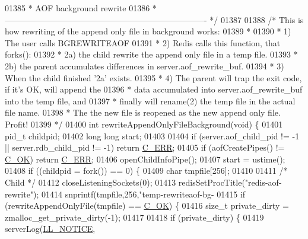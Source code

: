 \begin{DoxyCode}
{{{{{{{{{{{{{{{{{{{{{{{01385 \textcolor{comment}{ * AOF background rewrite}
01386 \textcolor{comment}{ * ------------------------------------------------------------------------- */}
01387 
01388 \textcolor{comment}{/* This is how rewriting of the append only file in background works:}
01389 \textcolor{comment}{ *}
01390 \textcolor{comment}{ * 1) The user calls BGREWRITEAOF}
01391 \textcolor{comment}{ * 2) Redis calls this function, that forks():}
01392 \textcolor{comment}{ *    2a) the child rewrite the append only file in a temp file.}
01393 \textcolor{comment}{ *    2b) the parent accumulates differences in server.aof\_rewrite\_buf.}
01394 \textcolor{comment}{ * 3) When the child finished '2a' exists.}
01395 \textcolor{comment}{ * 4) The parent will trap the exit code, if it's OK, will append the}
01396 \textcolor{comment}{ *    data accumulated into server.aof\_rewrite\_buf into the temp file, and}
01397 \textcolor{comment}{ *    finally will rename(2) the temp file in the actual file name.}
01398 \textcolor{comment}{ *    The the new file is reopened as the new append only file. Profit!}
01399 \textcolor{comment}{ */}
01400 \textcolor{keywordtype}{int} rewriteAppendOnlyFileBackground(\textcolor{keywordtype}{void}) \{
01401     pid\_t childpid;
01402     \textcolor{keywordtype}{long} \textcolor{keywordtype}{long} start;
01403 
01404     \textcolor{keywordflow}{if} (server.aof\_child\_pid != -1 || server.rdb\_child\_pid != -1) \textcolor{keywordflow}{return} 
      \hyperlink{server_8h_af98ac28d5f4d23d7ed5985188e6fb7d1}{C\_ERR};
01405     \textcolor{keywordflow}{if} (aofCreatePipes() != \hyperlink{server_8h_a303769ef1065076e68731584e758d3e1}{C\_OK}) \textcolor{keywordflow}{return} \hyperlink{server_8h_af98ac28d5f4d23d7ed5985188e6fb7d1}{C\_ERR};
01406     openChildInfoPipe();
01407     start = ustime();
01408     \textcolor{keywordflow}{if} ((childpid = fork()) == 0) \{
01409         \textcolor{keywordtype}{char} tmpfile[256];
01410 
01411         \textcolor{comment}{/* Child */}
01412         closeListeningSockets(0);
01413         redisSetProcTitle(\textcolor{stringliteral}{"redis-aof-rewrite"});
01414         snprintf(tmpfile,256,\textcolor{stringliteral}{"temp-rewriteaof-bg-%
01415         \textcolor{keywordflow}{if} (rewriteAppendOnlyFile(tmpfile) == \hyperlink{server_8h_a303769ef1065076e68731584e758d3e1}{C\_OK}) \{
01416             size\_t private\_dirty = zmalloc\_get\_private\_dirty(-1);
01417 
01418             \textcolor{keywordflow}{if} (private\_dirty) \{
01419                 serverLog(\hyperlink{server_8h_a8c54c191e436c7dd3012167212692401}{LL\_NOTICE},
}}}}}}}}}}}}}}}}}}}}}}}}
\end{DoxyCode}
